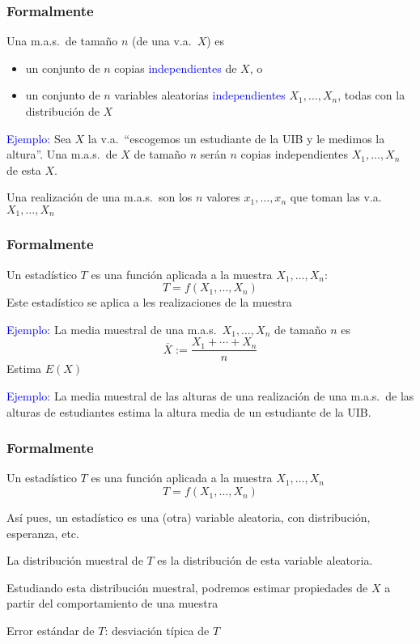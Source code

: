 \documentclass[12pt,t]{beamer}
\newcommand{\blue}[1]{\textcolor{blue}{#1}}
\renewcommand{\emph}[1]{{\color{red}#1}}
\theoremstyle{plain}
\theoremstyle{definition}
\begin{document}
\begin{frame}
\frametitle{Formalmente}

Una \emph{m.a.s.\ de tamaño $n$} (de una v.a.\ $X$) es
\begin{itemize}
\item  un conjunto de $n$ copias \blue{independientes} de $X$, o

\item un conjunto de $n$ variables aleatorias  \blue{independientes} $X_1,\ldots,X_n$, todas con la distribución de  $X$
\end{itemize}
\medskip


\blue{Ejemplo:} Sea $X$ la v.a.\ ``escogemos un estudiante de la UIB y le medimos la altura''. Una m.a.s.\ de $X$ de tamaño $n$ serán $n$ copias independientes $X_1,\ldots,X_n$ de esta $X$.
\bigskip


Una \emph{realización} de una m.a.s.\ son los $n$ valores $x_1,\ldots,x_n$ que  toman las v.a.\ $X_1,\ldots,X_n$

\end{frame}


\begin{frame}
\frametitle{Formalmente}

Un  \emph{estadístico} $T$ es una función aplicada a la muestra $X_1,\ldots,X_n$:
$$
T=f(X_1,\ldots,X_n)
$$
Este estadístico se aplica a les realizaciones  de la muestra
\medskip

\blue{Ejemplo:} La \emph{media muestral} de una m.a.s.\ $X_1,\ldots,X_n$ de tamaño $n$ es 
$$
\overline{X}:=\frac{X_1+\cdots+X_n}{n}
$$
Estima $E(X)$
\medskip

\blue{Ejemplo:} La media muestral de las alturas de una
realización de una m.a.s.\ de  las alturas  de estudiantes estima  la altura media de un estudiante de la UIB.




\end{frame}


\begin{frame}
\frametitle{Formalmente}

Un  \emph{estadístico} $T$ es una función aplicada a la muestra $X_1,\ldots,X_n$
$$
T=f(X_1,\ldots,X_n)
$$
\medskip

Así pues, un estadístico es una (otra) variable aleatoria, con distribución, esperanza, etc.
\medskip

La \emph{distribución muestral} de $T$ es la distribución de  esta variable aleatoria.
\medskip

Estudiando  esta distribución muestral, podremos estimar propiedades de $X$ a partir del comportamiento de una muestra
\medskip

\emph{Error estándar de $T$}: desviación típica de $T$


\end{frame}
\end{document}
